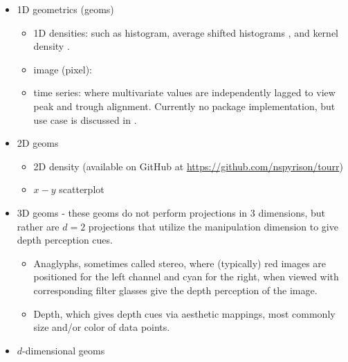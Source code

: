 \documentclass{monashthesis}
\begin{document}
\begin{itemize}
\tightlist
\item
  1D geometrics (geoms)

  \begin{itemize}
  \tightlist
  \item
    1D densities: such as histogram, average shifted histograms
    \autocite{scott_averaged_1985}, and kernel density
    \autocite{scott_incorporating_1995}.
  \item
    image (pixel): \autocite{wegman_pixel_2001}
  \item
    time series: where multivariate values are independently lagged to
    view peak and trough alignment. Currently no package implementation,
    but use case is discussed in \autocite{cook_manual_1997}.
  \end{itemize}
\item
  2D geoms

  \begin{itemize}
  \tightlist
  \item
    2D density (available on GitHub at
    \url{https://github.com/nspyrison/tourr})
  \item
    \(x-y\) scatterplot
  \end{itemize}
\item
  3D geoms - these geoms do not perform projections in 3 dimensions, but
  rather are \(d=2\) projections that utilize the manipulation dimension
  to give depth perception cues.

  \begin{itemize}
  \tightlist
  \item
    Anaglyphs, sometimes called stereo, where (typically) red images are
    positioned for the left channel and cyan for the right, when viewed
    with corresponding filter glasses give the depth perception of the
    image.
  \item
    Depth, which gives depth cues via aesthetic mappings, most commonly
    size and/or color of data points.
  \end{itemize}
\item
  \(d\)-dimensional geoms


\end{itemize}
\end{document}
